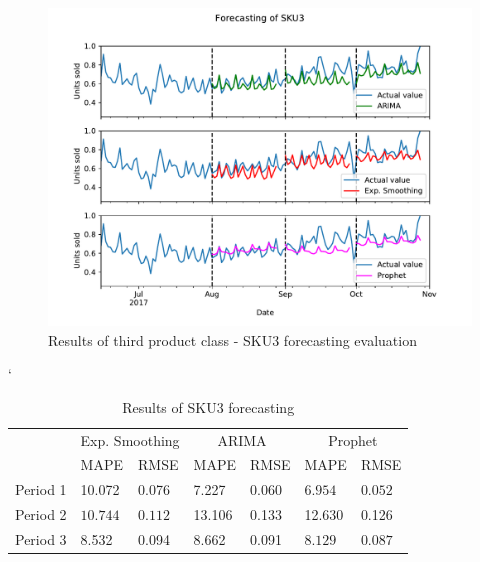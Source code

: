 \documentclass[11pt,a4paper]{article}
\begin{document}
\begin{figure}
  \includegraphics[width=1\linewidth]{figures/SKU3_sep.pdf}
  \caption{Results of third product class - SKU3 forecasting evaluation}
  \label{fig:sku3_sep}
\end{figure}


\begin{table} \catcode`
\centering
\begin{tabular}{|l|l|l|l|l|l|l|}
\hline
\multirow{2}{*}{} & \multicolumn{2}{c|}{Exp. Smoothing} & \multicolumn{2}{c|}{ARIMA} & \multicolumn{2}{c|}{Prophet} \\ \cline{2-7} 
                  & MAPE         & RMSE        & MAPE          & RMSE          & MAPE         & RMSE         \\ \hline
Period 1 & 10.072 & 0.076 & 7.227 & 0.060 &  \boldmath$6.954$\unboldmath & \boldmath$ 0.052$\unboldmath  \\ \hline
Period 2 &   \boldmath$10.744$\unboldmath &  \boldmath$0.112$\unboldmath & 13.106 & 0.133 & 12.630 & 0.126   \\ \hline
Period 3 & 8.532 & 0.094 & 8.662 & 0.091 &  \boldmath$8.129$\unboldmath &  \boldmath$0.087$\unboldmath  \\ \hline
\end{tabular}
\caption{Results of SKU3 forecasting}
\label{tbl:forecast_3}
\end{table}
\end{document}
